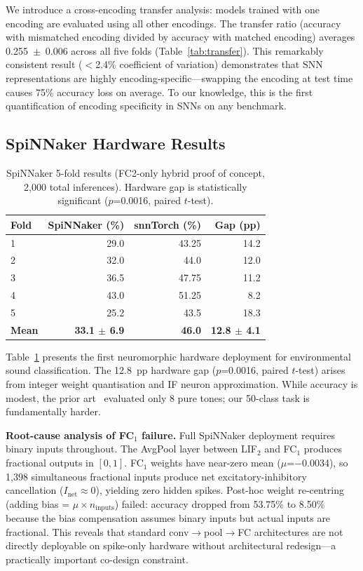 \documentclass[sigconf,nonacm=false]{acmart}
\begin{document}
We introduce a cross-encoding transfer analysis: models trained with one encoding are evaluated using all other encodings. The transfer ratio (accuracy with mismatched encoding divided by accuracy with matched encoding) averages 0.255~$\pm$~0.006 across all five folds (Table~\ref{tab:transfer}). This remarkably consistent result ($<$2.4\% coefficient of variation) demonstrates that SNN representations are highly encoding-specific---swapping the encoding at test time causes 75\% accuracy loss on average. To our knowledge, this is the first quantification of encoding specificity in SNNs on any benchmark.

\subsection{SpiNNaker Hardware Results}
\label{sec:spinnaker_results}

\begin{table}[t]
\caption{SpiNNaker 5-fold results (FC2-only hybrid proof of concept, 2{,}000 total inferences). Hardware gap is statistically significant ($p$=0.0016, paired $t$-test).}
\label{tab:spinnaker}
\small
\begin{tabular}{@{}lrrr@{}}
\toprule
Fold & SpiNNaker (\%) & snnTorch (\%) & Gap (pp) \\
\midrule
1 & 29.0 & 43.25 & 14.2 \\
2 & 32.0 & 44.0 & 12.0 \\
3 & 36.5 & 47.75 & 11.2 \\
4 & 43.0 & 51.25 & 8.2 \\
5 & 25.2 & 43.5 & 18.3 \\
\midrule
\textbf{Mean} & \textbf{33.1 $\pm$ 6.9} & \textbf{46.0} & \textbf{12.8 $\pm$ 4.1} \\
\bottomrule
\end{tabular}
\end{table}

Table~\ref{tab:spinnaker} presents the first neuromorphic hardware deployment for environmental sound classification. The 12.8~pp hardware gap ($p$=0.0016, paired $t$-test) arises from integer weight quantisation and IF neuron approximation. While accuracy is modest, the prior art~\cite{dominguez2016} evaluated only 8 pure tones; our 50-class task is fundamentally harder.

\textbf{Root-cause analysis of FC$_1$ failure.} Full SpiNNaker deployment requires binary inputs throughout. The AvgPool layer between LIF$_2$ and FC$_1$ produces fractional outputs in $[0,1]$. FC$_1$ weights have near-zero mean ($\mu$=$-$0.0034), so 1{,}398 simultaneous fractional inputs produce net excitatory-inhibitory cancellation ($I_\text{net} \approx 0$), yielding zero hidden spikes. Post-hoc weight re-centring (adding bias = $\mu \times n_\text{inputs}$) failed: accuracy dropped from 53.75\% to 8.50\% because the bias compensation assumes binary inputs but actual inputs are fractional. This reveals that standard conv$\to$pool$\to$FC architectures are not directly deployable on spike-only hardware without architectural redesign---a practically important co-design constraint.
\end{document}
